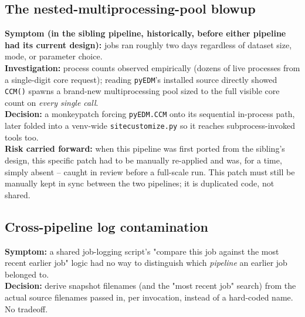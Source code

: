 \documentclass[11pt]{article}
\begin{document}
\subsection{The nested-multiprocessing-pool blowup}
\label{sec:history-pool}
\textbf{Symptom (in the sibling pipeline, historically, before either pipeline had its current design):} jobs ran roughly two days regardless of dataset size, mode, or parameter choice.\\
\textbf{Investigation:} process counts observed empirically (dozens of live processes from a single-digit core request); reading \texttt{pyEDM}'s installed source directly showed \texttt{CCM()} spawns a brand-new multiprocessing pool sized to the full visible core count on \emph{every single call}.\\
\textbf{Decision:} a monkeypatch forcing \texttt{pyEDM.CCM} onto its sequential in-process path, later folded into a venv-wide \texttt{sitecustomize.py} so it reaches subprocess-invoked tools too.\\
\textbf{Risk carried forward:} when this pipeline was first ported from the sibling's design, this specific patch had to be manually re-applied and was, for a time, simply absent -- caught in review before a full-scale run. This patch must still be manually kept in sync between the two pipelines; it is duplicated code, not shared.

\subsection{Cross-pipeline log contamination}
\textbf{Symptom:} a shared job-logging script's "compare this job against the most recent earlier job" logic had no way to distinguish which \emph{pipeline} an earlier job belonged to.\\
\textbf{Decision:} derive snapshot filenames (and the "most recent job" search) from the actual source filenames passed in, per invocation, instead of a hard-coded name. No tradeoff.
\end{document}
